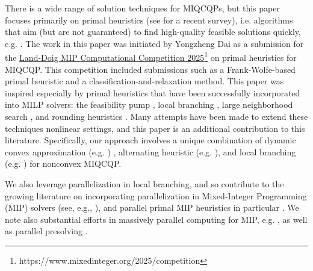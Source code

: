 \documentclass[]{article}
\begin{document}
There is a wide range of solution techniques for MIQCQPs, but this paper focuses primarily on primal heuristics (see \cite{berthold2018computational} for a recent survey), i.e. algorithms that aim (but are not guaranteed) to find high-quality feasible solutions quickly, e.g. \cite{chicco2020metaheuristic,lopez2013heuristic,cattaruzza2024exact}. The work in this paper was initiated by Yongzheng Dai as a submission for the \href{https://github.com/foreverdyz/primalheuristic\_miqcqp}{Land-Doig MIP Computational Competition 2025}\footnote{https://www.mixedinteger.org/2025/competition} on primal heuristics for MIQCQP. This competition included submissions such as a Frank-Wolfe-based primal heuristic \cite{mexi2025frank} and a classification-and-relaxation method. This paper was inspired especially by primal heuristics that have been successfully incorporated into MILP solvers: the feasibility pump \cite{fischetti2005feasibility}, local branching \cite{fischetti2003local,nannicini2008local}, large neighborhood search \cite{pisinger2018large}, and rounding heuristics \cite{nannicini2012rounding}. Many attempts have been made to extend these techniques nonlinear settings, and this paper is an additional contribution to this literature. Specifically, our approach involves a unique combination of dynamic convex approximation (e.g. \cite{gomez2025solving,castro2015tightening,beach2022compact,wiese2021computational,bienstock2025accurate}) , alternating heuristic (e.g.  \cite{d2012storm, belotti2017three}), and local branching (e.g. \cite{liberti2011recipe}) for nonconvex MIQCQP. 

We also leverage parallelization in local branching, and so contribute to the growing literature on incorporating parallelization in Mixed-Integer Programming (MIP) solvers (see, e.g., \cite{bixby2007progress,berthold2012solving,achterberg2013mixed,koch2022progress}), and parallel primal MIP heuristics in particular \cite{powley1990parallel, linderoth2001parallel, salvagnin2025fix, mexi2025frank}. We note also substantial efforts in massively parallel computing for MIP, e.g. \cite{phillips2006massively,eckstein2015pebbl,shinano2016solving,koch2012could,shinano2018fiberscip,perumalla2021design}, as well as parallel presolving \cite{gleixner2023papilo,dai2023parallelized,dai2024serial}. 
\end{document}
